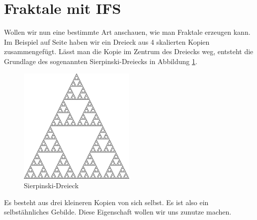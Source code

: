 %
%
%
\section{Fraktale mit IFS 
\label{ifs:section:teil2}}
Wollen wir nun eine bestimmte Art anschauen, wie man Fraktale erzeugen kann.
Im Beispiel auf Seite \pageref{ifs:trinagle} haben wir ein Dreieck aus 4 skalierten Kopien zusammengefügt.
Lässt man die Kopie im Zentrum des Dreiecks weg, entsteht die Grundlage des sogenannten Sierpinski-Dreiecks in Abbildung \ref{ifs:sierpinski10}.
%
\begin{figure}
	\centering
	\includegraphics[width=0.5\textwidth]{papers/ifs/images/sierpinski}
	\caption{Sierpinski-Dreieck}
	\label{ifs:sierpinski10}
\end{figure}
Es besteht aus drei kleineren Kopien von sich selbst.
Es ist also ein selbstähnliches Gebilde.
Diese Eigenschaft wollen wir uns zunutze machen.


